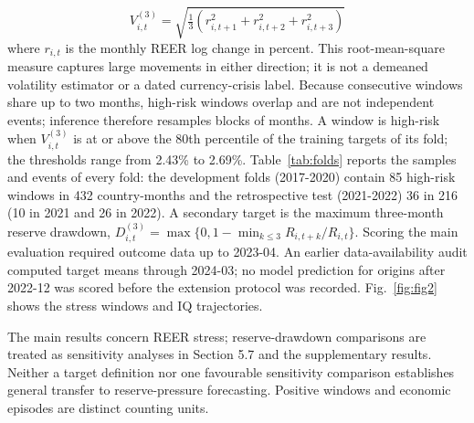 \documentclass[preprint,12pt,authoryear]{elsarticle}
\begin{document}
\begin{equation}\label{eq:V}
V^{(3)}_{i,t} = \sqrt{\tfrac{1}{3}\left(r_{i,t+1}^2 + r_{i,t+2}^2 + r_{i,t+3}^2\right)}
\end{equation}
where $r_{i,t}$ is the monthly REER log change in percent. This root-mean-square measure captures large movements in either direction; it is not a demeaned volatility estimator or a dated currency-crisis label. Because consecutive windows share up to two months, high-risk windows overlap and are not independent events; inference therefore resamples blocks of months. A window is high-risk when $V^{(3)}_{i,t}$ is at or above the 80th percentile of the training targets of its fold; the thresholds range from 2.43\% to 2.69\%. Table~\ref{tab:folds} reports the samples and events of every fold: the development folds (2017-2020) contain 85 high-risk windows in 432 country-months and the retrospective test (2021-2022) 36 in 216 (10 in 2021 and 26 in 2022). A secondary target is the maximum three-month reserve drawdown, $D^{(3)}_{i,t} = \max\{0, 1 - \min_{k \le 3} R_{i,t+k}/R_{i,t}\}$. Scoring the main evaluation required outcome data up to 2023-04. An earlier data-availability audit computed target means through 2024-03; no model prediction for origins after 2022-12 was scored before the extension protocol was recorded. Fig.~\ref{fig:fig2} shows the stress windows and IQ trajectories.

The main results concern REER stress; reserve-drawdown comparisons are treated as sensitivity analyses in Section 5.7 and the supplementary results. Neither a target definition nor one favourable sensitivity comparison establishes general transfer to reserve-pressure forecasting. Positive windows and economic episodes are distinct counting units.
\end{document}
